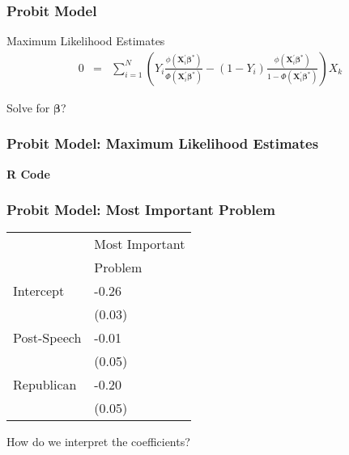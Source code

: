 \documentclass{beamer}
\begin{document}
\begin{frame}
\frametitle{Probit Model}

Maximum Likelihood Estimates
\begin{eqnarray}
0 &= & \sum_{i=1}^{N} \left(Y_{i} \frac{\phi(\boldsymbol{X}_{i}^{'} \boldsymbol{\beta}^{*})}{\Phi(\boldsymbol{X}_{i}^{'}\boldsymbol{\beta}^{*} )} - (1-Y_{i}) \frac{\phi(\boldsymbol{X}_{i}^{'} \boldsymbol{\beta}^{*} )}{1- \Phi(\boldsymbol{X}_{i}^{'}\boldsymbol{\beta}^{*})}\right)X_{k} \nonumber
\end{eqnarray}

Solve for $\boldsymbol{\beta}$?
\pause
{}
\end{frame}


\begin{frame}




\end{frame}



\begin{frame}
\frametitle{Probit Model: Maximum Likelihood Estimates}

\textbf{R Code}


\end{frame}

\begin{frame}
\frametitle{Probit Model: Most Important Problem}

\begin{tabular}{ll}
	\hline
	& Most Important \\
	&  Problem \\
\hline
Intercept & -0.26  \\
		  & (0.03) \\
Post-Speech & -0.01 \\
			& (0.05) \\
Republican & -0.20 \\
			& (0.05) \\
\hline
\end{tabular}

How do we interpret the coefficients? \pause \\

\end{frame}
\end{document}
